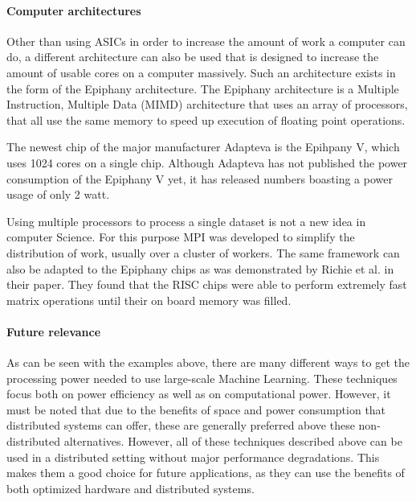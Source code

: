 \paragraph{Computer architectures}
Other than using ASICs in order to increase the amount of work a computer can do,
a different architecture can also be used that is designed to increase the amount
of usable cores on a computer massively. Such an architecture exists in the form
of the Epiphany architecture. The Epiphany architecture is a Multiple Instruction,
Multiple Data (MIMD) architecture that uses an array of processors, that all use the
same memory to speed up execution of floating point operations\cite{Olof16}.

The newest chip of the major manufacturer Adapteva is the Epihpany V, which uses
1024 cores on a single chip\cite{Olof16}. Although Adapteva has not published the power consumption of the Epiphany V yet,
it has released numbers boasting a power usage of only 2 watt\cite{Adap}.

Using multiple processors to process a single dataset is not a new idea in computer Science. For this purpose MPI was developed to simplify the distribution of work, usually over a cluster of workers. The same framework can also be adapted to the Epiphany chips as was demonstrated by Richie et al. in their paper. They found that the RISC chips were able to perform extremely fast matrix operations until their on board memory was filled\cite{Rich15}.

\paragraph{Future relevance}
As can be seen with the examples above, there are many different ways to get the processing power needed to use large-scale Machine Learning. These techniques focus both on power efficiency as well as on computational power. However, it must be noted that due to the benefits of space and power consumption that distributed systems can offer, these are generally preferred above these non-distributed alternatives. However, all of these techniques described above can be used in a distributed setting without major performance degradations. This makes them a good choice for future applications, as they can use the benefits of both optimized hardware and distributed systems.
